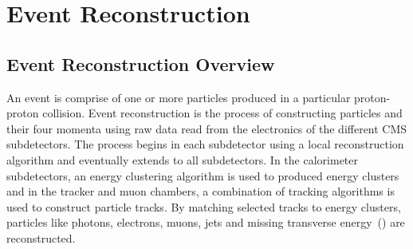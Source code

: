 \chapter{Event Reconstruction}
\label{Reconstruction_and Particle_ID_chapter}
\section{Event Reconstruction Overview}
An event is comprise of one or more particles produced in a particular proton-proton collision.
Event reconstruction is the process of constructing particles and their four momenta using raw data read from the electronics of the different CMS subdetectors. The process begins in each subdetector using a local reconstruction algorithm and eventually extends to all subdetectors. In the calorimeter subdetectors, an energy clustering algorithm is used to produced energy clusters and in the tracker and muon chambers, a combination of tracking algorithms is used to construct particle tracks. By matching selected tracks to energy clusters, particles like photons, electrons, muons, jets and missing transverse energy~(\MET) are reconstructed.
